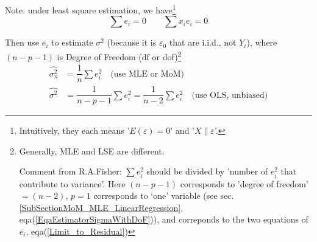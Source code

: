     Note: under least square estimation, we have\footnote{Intuitively, they each means '$ E(\varepsilon )=0 $' and '$ X\parallel \varepsilon  $'.}
\begin{equation}\label{Limit_to_Residual}
        \sum e_i=0\qquad \sum x_ie_i=0 
\end{equation}
    

    Then use $ e_i $ to estimate $ \sigma ^2 $ (because it is $ \varepsilon _0 $ that are i.i.d., not $ Y_i $), where $ (n-p-1) $ is Degree of Freedom (df or dof)\footnote{Generally, MLE and LSE are different.

    Comment from R.A.Fisher: $ \sum e_i^2 $ should be divided by 'number of $ e_i^2 $ that contribute to variance'. Here $ (n-p-1) $ corresponds to 'degree of freedom' $ =(n-2) $, $ p=1 $ corresponds to `one' variable (see sec.\ref{SubSectionMoM_MLE_LinearRegression}, eqa(\ref{EqaEstimatorSigmaWithDoF})), and correponds to the two equations of $ e_i $, eqa(\ref{Limit_to_Residual})}
\begin{equation}\label{EqaOLSEstimatorOfSigma}
    \begin{aligned}
        \hat{\sigma _n^2}&=\dfrac{1}{n}\sum e_i^2 \quad\text{(use MLE or MoM)}\\
        \hat{\sigma^2}&=\dfrac{1}{n-p-1}\sum e_i^2=\dfrac{1}{n-2}\sum e_i^2\quad\text{(use OLS, unbiased)}
\end{aligned}
\end{equation}













